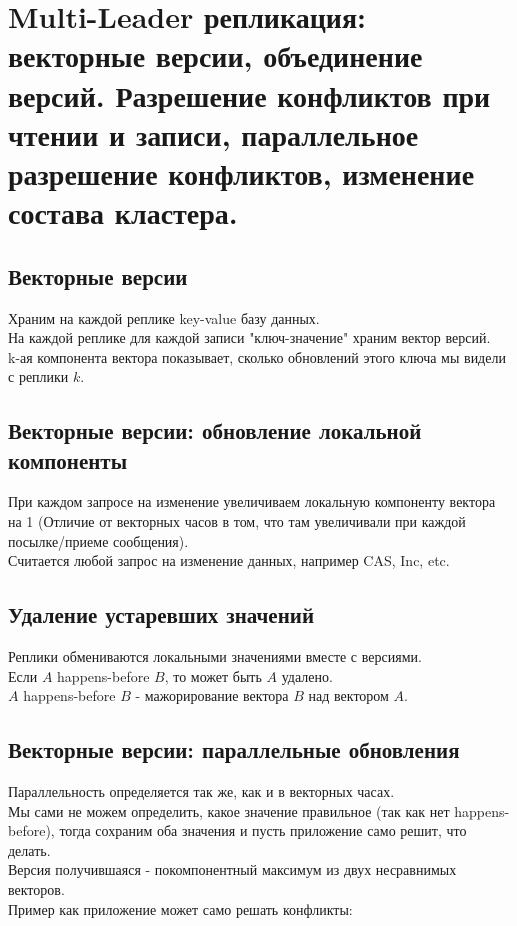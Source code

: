 \section{Multi-Leader репликация: векторные версии, объединение версий. Разрешение конфликтов при чтении и записи, параллельное разрешение конфликтов, изменение состава кластера.}

\subsection{Векторные версии}
Храним на каждой реплике key-value базу данных. \\
На каждой реплике для каждой записи "ключ-значение" храним вектор
версий. \\
k-ая компонента вектора показывает, сколько обновлений этого ключа мы видели с реплики $k$.
\subsection{Векторные версии: обновление локальной компоненты}
При каждом запросе на изменение увеличиваем локальную компоненту вектора на 1 (Отличие от векторных часов в том, что там увеличивали при каждой посылке/приеме сообщения). \\
Считается любой запрос на изменение данных, например CAS, Inc, etc.
\subsection{Удаление устаревших значений}
Реплики обмениваются локальными значениями вместе с версиями. \\
Если $A$ happens-before $B$, то может быть $A$ удалено. \\
$A$ happens-before $B$ - мажорирование вектора $B$ над вектором $A$.
\subsection{Векторные версии: параллельные обновления}
Параллельность определяется так же, как и в векторных часах. \\
Мы сами не можем определить, какое значение правильное (так как нет happens-before), тогда сохраним оба значения и пусть приложение само решит, что делать. \\
Версия получившаяся - покомпонентный максимум из двух несравнимых векторов. \\
Пример как приложение может само решать конфликты:\\

